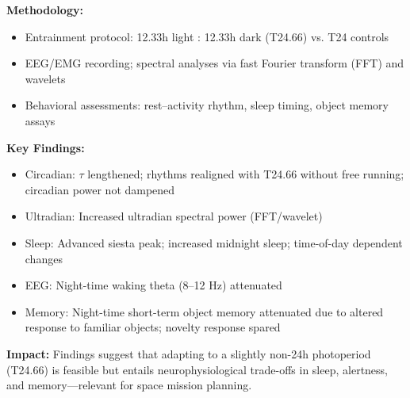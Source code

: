\textbf{Methodology:}
\begin{itemize}[leftmargin=1.2em, itemsep=0.1em]
  \item Entrainment protocol: 12.33h light : 12.33h dark (T24.66) vs. T24 controls
  \item EEG/EMG recording; spectral analyses via fast Fourier transform (FFT) and wavelets
  \item Behavioral assessments: rest–activity rhythm, sleep timing, object memory assays
\end{itemize}

\textbf{Key Findings:}
\begin{itemize}[leftmargin=1.2em, itemsep=0.1em]
  \item Circadian: \(\tau\) lengthened; rhythms realigned with T24.66 without free running; circadian power not dampened
  \item Ultradian: Increased ultradian spectral power (FFT/wavelet)
  \item Sleep: Advanced siesta peak; increased midnight sleep; time-of-day dependent changes
  \item EEG: Night-time waking theta (8--12 Hz) attenuated
  \item Memory: Night-time short-term object memory attenuated due to altered response to familiar objects; novelty response spared
\end{itemize}

\textbf{Impact:} Findings suggest that adapting to a slightly non-24h photoperiod (T24.66) is feasible but entails neurophysiological trade-offs in sleep, alertness, and memory—relevant for space mission planning.